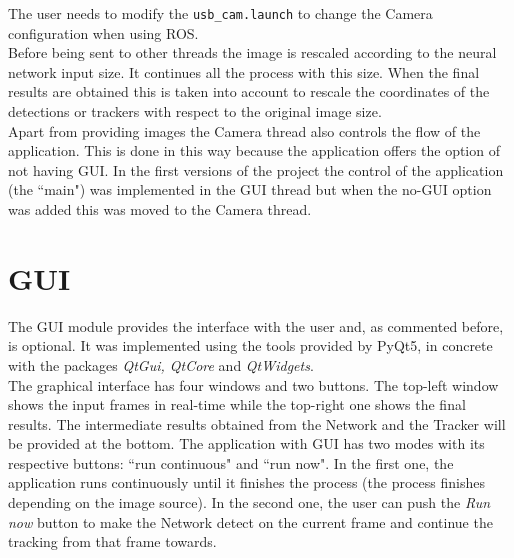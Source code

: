 The user needs to modify the \texttt{usb\_cam.launch} to change the Camera configuration when using ROS.\\
Before being sent to other threads the image is rescaled according to the neural network input size. It continues all the process with this size. When the final results are obtained this is taken into account to rescale the coordinates of the detections or trackers with respect to the original image size.\\
Apart from providing images the Camera thread also controls the flow of the application. This is done in this way because the application offers the option of not having GUI. In the first versions of the project the control of the application (the ``main") was implemented in the GUI thread but when the no-GUI option was added this was moved to the Camera thread.\\

\section{GUI}
The GUI module provides the interface with the user and, as commented before, is optional. It was implemented using the tools provided by PyQt5, in concrete with the packages \textit{QtGui, QtCore} and \textit{QtWidgets}.\\
The graphical interface has four windows and two buttons. The top-left window shows the input frames in real-time while the top-right one shows the final results. The intermediate results obtained from the Network and the Tracker will be provided at the bottom. The application with GUI has two modes with its respective buttons: ``run continuous" and ``run now". In the first one, the application runs continuously until it finishes the process (the process finishes depending on the image source). In the second one, the user can push the \textit{Run now} button to make the Network detect on the current frame and continue the tracking from that frame towards.
